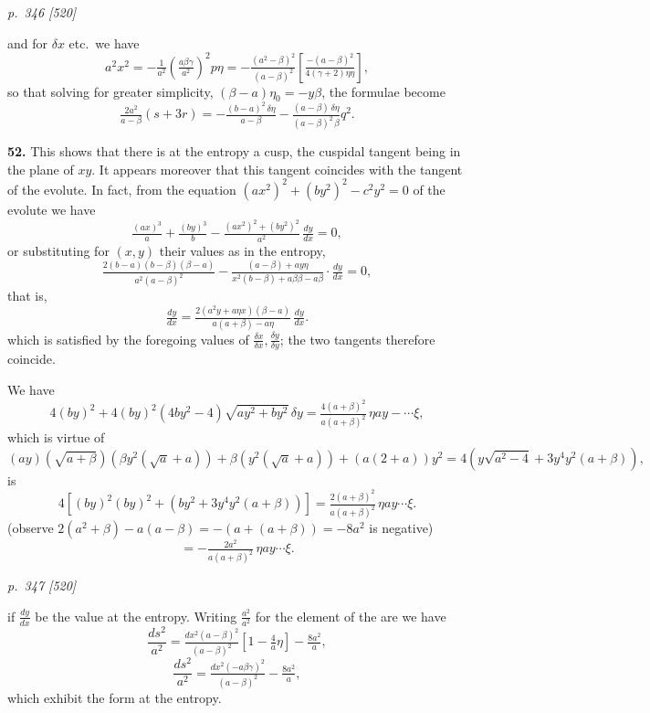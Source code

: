 \documentclass[11pt,a4paper]{book}
\begin{document}
\clearpage

\bigskip
\textit{p.~346 [520]}
\smallskip

and for $\delta x$ etc.\ we have
\[
a^2 x^2 = -\tfrac{1}{a^2}\!\left(\tfrac{a\beta\gamma}{a^2}\right)^2 p\eta = -\tfrac{(a^2 - \beta)^2}{(a - \beta)^2}\!\left[\tfrac{-(a - \beta)^2}{4(\gamma + 2)\eta\eta}\right],
\]
so that solving for greater simplicity, $(\beta - a)\eta_0 = -y\beta$, the formulae become
\[
\tfrac{2a^2}{a - \beta}(s + 3r) = -\tfrac{(b - a)^2 \, \delta\eta}{a - \beta} - \tfrac{(a - \beta) \, \delta\eta}{(a - \beta)^2 \, \beta} q^2.
\]

\textbf{52.} This shows that there is at the entropy a cusp, the cuspidal tangent being in the plane of $xy$. It appears moreover that this tangent coincides with the tangent of the evolute. In fact, from the equation $(ax^2)^2 + (by^2)^2 - c^2 y^2 = 0$ of the evolute we have
\[
\tfrac{(ax)^3}{a} + \tfrac{(by)^3}{b} - \tfrac{(ax^2)^2 + (by^2)^2}{a^2}\,\tfrac{dy}{dx} = 0,
\]
or substituting for $(x, y)$ their values as in the entropy,
\[
\tfrac{2(b - a)(b - \beta)(\beta - a)}{a^2(a - \beta)^2} - \tfrac{(a - \beta) + a y\eta}{x^2(b - \beta) + a\beta\beta - a\beta}\cdot\tfrac{dy}{dx} = 0,
\]
that is,
\[
\tfrac{dy}{dx} = \tfrac{2(a^2 y + a\eta x)(\beta - a)}{a(a + \beta) - a\eta}\,\tfrac{dy}{dx}.
\]
which is satisfied by the foregoing values of $\tfrac{\delta x}{\delta x}, \tfrac{\delta y}{\delta y}$; the two tangents therefore coincide.

We have
\[
4(by)^2 + 4(by)^2 (4by^2 - 4)\sqrt{a y^2 + b y^2}\,\delta y = \tfrac{4(a + \beta)^2}{a(a + \beta)^2}\,\eta a y - \cdots\xi,
\]
which is virtue of
\[
(ay)(\sqrt{a + \beta})(\beta y^2(\sqrt{a} + a)) + \beta(y^2(\sqrt{a} + a)) + (a(2 + a))y^2 = 4(y\sqrt{a^2 - 4} + 3y^4 y^2(a + \beta)),
\]
is
\[
4[(by)^2(by)^2 + (by^2 + 3y^4 y^2(a + \beta))] = \tfrac{2(a + \beta)^2}{a(a + \beta)^2}\,\eta a y \cdots\xi.
\]
(observe $2(a^2 + \beta) - a(a - \beta) = -(a + (a + \beta)) = -8a^2$ is negative)
\[
= -\tfrac{2a^2}{a(a + \beta)^2}\,\eta a y \cdots\xi.
\]

\clearpage

\bigskip
\textit{p.~347 [520]}
\smallskip

if $\tfrac{dy}{dx}$ be the value at the entropy. Writing $\tfrac{a^2}{a^2}$ for the element of the are we have
\[
\frac{ds^2}{a^2} = \tfrac{dx^2(a - \beta)^2}{(a - \beta)^2}\!\left[1 - \tfrac{4}{a}\eta\right] - \tfrac{8a^2}{a},
\]
\[
\frac{ds^2}{a^2} = \tfrac{dx^2(-a\beta\gamma)^2}{(a - \beta)^2} - \tfrac{8a^2}{a},
\]
which exhibit the form at the entropy.
\end{document}
